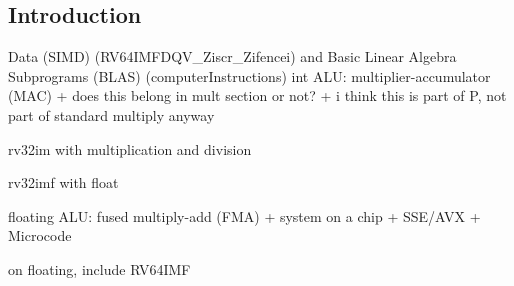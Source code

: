 
\subsection{Introduction}

Data (SIMD) (RV64IMFDQV\_Ziscr\_Zifencei) and Basic Linear Algebra Subprograms (BLAS) (computerInstructions)
int ALU: multiplier-accumulator (MAC)
+ does this belong in mult section or not?
+ i think this is part of P, not part of standard multiply anyway

rv32im
with multiplication and division

rv32imf
with float

floating ALU: fused multiply-add (FMA)
+ system on a chip
+ SSE/AVX
+ Microcode


on floating, include RV64IMF


